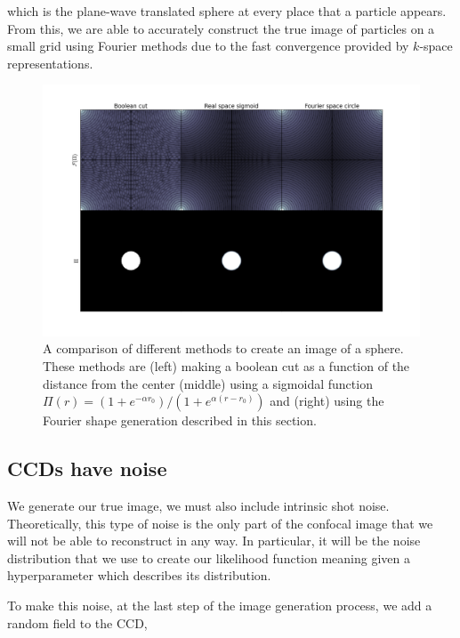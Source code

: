 \documentclass[preprint,amsmath,amssymb]{revtex4}
\begin{document}
which is the plane-wave translated sphere at every place that a particle
appears. From this, we are able to accurately construct the true image of
particles on a small grid using Fourier methods due to the fast convergence
provided by $k$-space representations.

\begin{figure}[ht]
    \includegraphics[width=0.95\columnwidth]{figs/sphere_generation_comparison.png}

    \caption{A comparison of different methods to create an image of a sphere.
        These methods are (left) making a boolean cut as a function of the
        distance from the center (middle) using a sigmoidal function $\Pi(r) =
        (1 + e^{-\alpha r_0}) / (1 + e^{\alpha (r - r_0)})$ and (right) using the Fourier shape
    generation described in this section.}

    \label{fig:sphere_generation_comparison}
\end{figure}



\subsection{CCDs have noise}

We generate our true image, we must also include intrinsic shot noise.
Theoretically, this type of noise is the only part of the confocal image
that we will not be able to reconstruct in any way.  In particular, it
will be the noise distribution that we use to create our likelihood function
meaning given a hyperparameter which describes its distribution.

To make this noise, at the last step of the image generation process, we
add a random field to the CCD,
\end{document}
